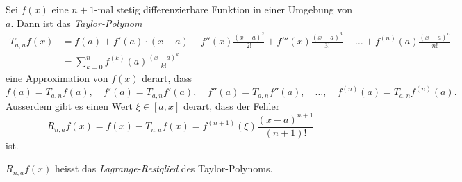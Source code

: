 \begin{satz}
Sei $f(x)$ eine $n+1$-mal stetig differenzierbare Funktion in einer
Umgebung von $a$.
Dann ist das {\em Taylor-Polynom}
\begin{align*}
T_{a,n}f(x)
&=
f(a) + f'(a)\cdot (x-a) + f''(x)\frac{(x-a)^2}{2!} + f'''(x)\frac{(x-a)^3}{3!}
+\dots+f^{(n)}(a)\frac{(x-a)^n}{n!}
\\
&=
\sum_{k=0}^n
f^{(k)}(a) \frac{(x-a)^k}{k!}
\end{align*}
eine Approximation von $f(x)$ derart, dass
\[
f(a)=T_{a,n}f(a),\quad
f'(a)=T_{a,n}f'(a),\quad
f''(a)=T_{a,n}f''(a),\quad
\dots,\quad
f^{(n)}(a)=T_{a,n}f^{(n)}(a).
\]
Ausserdem gibt es einen Wert $\xi\in[a,x]$ derart, dass der Fehler
\[
R_{n,a}f(x)
=
f(x) - T_{n,a}f(x)
=
f^{(n+1)}(\xi)\frac{(x-a)^{n+1}}{(n+1)!}
\]
ist.
\end{satz}
$R_{n,a}f(x)$ heisst das {\em Lagrange-Restglied} des Taylor-Polynoms.

